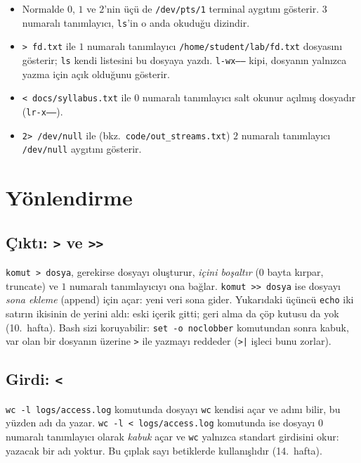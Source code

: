 \documentclass[11pt,a4paper]{article}
\newcommand{\cmd}[1]{\texttt{#1}}
\begin{document}
\begin{itemize}
  \item Normalde $0$, $1$ ve $2$'nin üçü de \texttt{/dev/pts/1} terminal aygıtını gösterir. $3$ numaralı tanımlayıcı, \cmd{ls}'in o anda okuduğu dizindir.
  \item \cmd{> fd.txt} ile $1$ numaralı tanımlayıcı \texttt{/home/student/lab/fd.txt} dosyasını gösterir; \cmd{ls} kendi listesini bu dosyaya yazdı. \texttt{l-wx------} kipi, dosyanın yalnızca yazma için açık olduğunu gösterir.
  \item \cmd{< docs/syllabus.txt} ile $0$ numaralı tanımlayıcı salt okunur açılmış dosyadır (\texttt{lr-x------}).
  \item \cmd{2> /dev/null} ile (bkz.\ \texttt{code/out\_streams.txt}) $2$ numaralı tanımlayıcı \texttt{/dev/null} aygıtını gösterir.
\end{itemize}

\section{Yönlendirme}
\label{sec:redir}

\subsection{Çıktı: \texttt{>} ve \texttt{>>}}



\cmd{komut > dosya}, gerekirse dosyayı oluşturur, \emph{içini boşaltır} ($0$ bayta kırpar, truncate) ve $1$ numaralı tanımlayıcıyı ona bağlar. \cmd{komut >> dosya} ise dosyayı \emph{sona ekleme} (append) için açar: yeni veri sona gider. Yukarıdaki üçüncü \cmd{echo} iki satırın ikisinin de yerini aldı: eski içerik gitti; geri alma da çöp kutusu da yok (10.~hafta). Bash sizi koruyabilir: \cmd{set -o noclobber} komutundan sonra kabuk, var olan bir dosyanın üzerine \cmd{>} ile yazmayı reddeder (\cmd{>|} işleci bunu zorlar).

\subsection{Girdi: \texttt{<}}



\cmd{wc -l logs/access.log} komutunda dosyayı \cmd{wc} kendisi açar ve adını bilir, bu yüzden adı da yazar. \cmd{wc -l < logs/access.log} komutunda ise dosyayı $0$ numaralı tanımlayıcı olarak \emph{kabuk} açar ve \cmd{wc} yalnızca standart girdisini okur: yazacak bir adı yoktur. Bu çıplak sayı betiklerde kullanışlıdır (14.~hafta).
\end{document}

